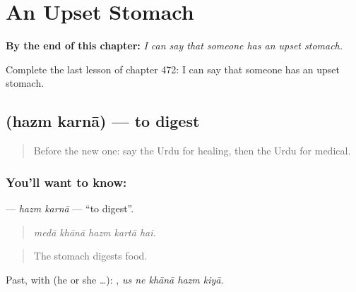 
\chapter{An Upset Stomach}
\label{ch:ur-an-upset-stomach}

\begin{chapteropening}
\textbf{By the end of this chapter:} \emph{I can say that someone has an upset stomach.}

Complete the last lesson of chapter 472: I can say that someone has an upset stomach.
\end{chapteropening}

\section[\texorpdfstring{\ur{ہضم} \ur{کرنا} (hazm karnā)}{ہضم کرنا (hazm karnā)}]{  (hazm karnā) — to digest}

\label{lesson:UR-C472-hazm-karna}



\begin{quote}
Before the new one: say the Urdu for healing, then the Urdu for medical.
\end{quote}

\subsection*{You'll want to know:  }
\textbf{ } — \emph{hazm karnā} — \textquotedblleft{}to digest\textquotedblright{}.

\begin{quote}
    
\end{quote}

\begin{quote}
\emph{medā khānā hazm kartā hai.}
\end{quote}

\begin{quote}
The stomach digests food.
\end{quote}

Past, with  (he or she …):     , \emph{us ne khānā hazm kiyā}.

